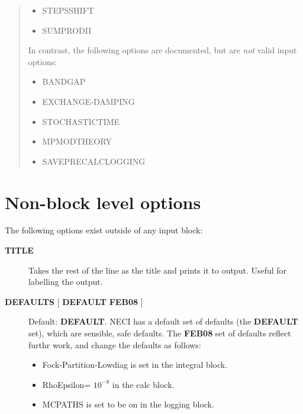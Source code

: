 \documentclass[openany,a4paper,10pt]{manual}
\begin{document}
\begin{notice}[warning]
\begin{quote}
\begin{itemize}
\item {} 
STEPSSHIFT

\item {} 
SUMPRODII

\end{itemize}

In contrast, the following options are documented, but are \emph{not} valid
input options:
\begin{itemize}
\item {} 
BANDGAP

\item {} 
EXCHANGE-DAMPING

\item {} 
STOCHASTICTIME

\item {} 
MPMODTHEORY

\item {} 
SAVEPRECALCLOGGING

\end{itemize}
\end{quote}
\end{notice}

\resetcurrentobjects


\hypertarget{input-non-block}{}\section{Non-block level options}

The following options exist outside of any input block:
\begin{description}
\item[\textbf{TITLE}]
Takes the rest of the line as the title and prints it to output.  Useful for labelling the output.

\item[\textbf{DEFAULTS} {[} \textbf{DEFAULT} \textbf{FEB08} {]}]
Default: \textbf{DEFAULT}.
NECI has a default set of defaults (the \textbf{DEFAULT} set), which are sensible, safe defaults.
The \textbf{FEB08} set of defaults reflect furthr work, and change the defaults as follows:
\begin{itemize}
\item {} 
Fock-Partition-Lowdiag is set in the integral block.

\item {} 
RhoEpsilon= $10^{-8}$ in the calc block.

\item {} 
MCPATHS is set to be on in the logging block.

\end{itemize}

\end{description}
\end{document}
